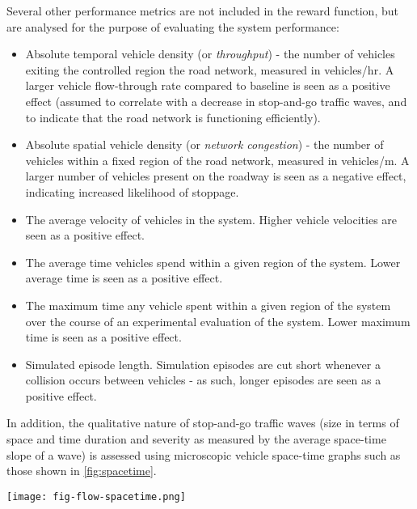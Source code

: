 \documentclass[12pt, a4paper, twocolumn]{article}
\newenvironment{Figure}
  {\par\medskip\noindent\minipage{\linewidth}}
  {\endminipage\par\medskip}
\begin{document}
\begin{multicols}{2}
{Several other performance metrics are not included in the reward function, but are analysed for the purpose of evaluating the system performance:

\begin{itemize}
    \item Absolute temporal vehicle density (or \textit{throughput}) - the number of vehicles exiting the controlled region the road network, measured in vehicles/hr.
    A larger vehicle flow-through rate compared to baseline is seen as a positive effect (assumed to correlate with a decrease in stop-and-go traffic waves, and to indicate that the road network is functioning efficiently).
    \item Absolute spatial vehicle density (or \textit{network congestion}) - the number of vehicles within a fixed region of the road network, measured in vehicles/m.
    A larger number of vehicles present on the roadway is seen as a negative effect, indicating increased likelihood of stoppage.
    \item The average velocity of vehicles in the system.
    Higher vehicle velocities are seen as a positive effect.
    \item The average time vehicles spend within a given region of the system.
    Lower average time is seen as a positive effect.
    \item The maximum time any vehicle spent within a given region of the system over the course of an experimental evaluation of the system.
    Lower maximum time is seen as a positive effect.
    \item Simulated episode length.
    Simulation episodes are cut short whenever a collision occurs between vehicles - as such, longer episodes are seen as a positive effect.
\end{itemize}

In addition, the qualitative nature of stop-and-go traffic waves (size in terms of space and time duration and severity as measured by the average space-time slope of a wave) is assessed using microscopic vehicle space-time graphs such as those shown in \cref{fig:spacetime}.

\begin{Figure}
    \centering
    \texttt{[image: fig-flow-spacetime.png]}
    \label{fig:spacetime}
\end{Figure}

}
\end{multicols}
\end{document}
